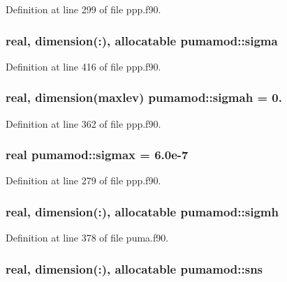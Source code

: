 \-Definition at line 299 of file ppp.\-f90.

\hypertarget{classpumamod_a645a8743bd64422c6d0b4dfc7182fa23}{
\subsubsection[{sigma}]{\setlength{\rightskip}{0pt plus 5cm}real, dimension(\-:), allocatable {\bf pumamod\-::sigma}}}
\label{classpumamod_a645a8743bd64422c6d0b4dfc7182fa23}


\-Definition at line 416 of file ppp.\-f90.

\hypertarget{classpumamod_a0fe6c7d70c84c4134653d23d7ba1f542}{
\subsubsection[{sigmah}]{\setlength{\rightskip}{0pt plus 5cm}real, dimension(maxlev) {\bf pumamod\-::sigmah} = 0.}}
\label{classpumamod_a0fe6c7d70c84c4134653d23d7ba1f542}


\-Definition at line 362 of file ppp.\-f90.

\hypertarget{classpumamod_abc4579c91fd4501ba251a05dd1bf516c}{
\subsubsection[{sigmax}]{\setlength{\rightskip}{0pt plus 5cm}real {\bf pumamod\-::sigmax} = 6.\-0e-\/7}}
\label{classpumamod_abc4579c91fd4501ba251a05dd1bf516c}


\-Definition at line 279 of file ppp.\-f90.

\hypertarget{classpumamod_aef4b93fe13f4ff77ca4ad9b9b5245918}{
\subsubsection[{sigmh}]{\setlength{\rightskip}{0pt plus 5cm}real, dimension(\-:), allocatable {\bf pumamod\-::sigmh}}}
\label{classpumamod_aef4b93fe13f4ff77ca4ad9b9b5245918}


\-Definition at line 378 of file puma.\-f90.

\hypertarget{classpumamod_af7adda7c9fa3da6ac86737a9579b4588}{
\subsubsection[{sns}]{\setlength{\rightskip}{0pt plus 5cm}real, dimension(\-:), allocatable {\bf pumamod\-::sns}}}
\label{classpumamod_af7adda7c9fa3da6ac86737a9579b4588}


